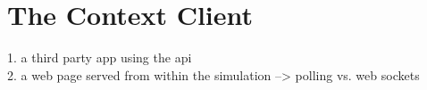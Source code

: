 \section{The Context Client} %
\label{sec:context_client}

1. a third party app using the api\\
2. a web page served from within the simulation --> polling vs. web sockets\\

